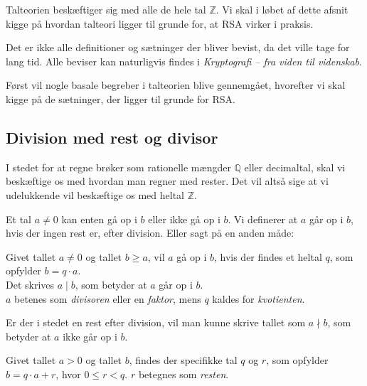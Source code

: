 

Talteorien beskæftiger sig med alle de hele tal \(\mathbb{Z}\).
Vi skal i løbet af dette afsnit kigge på hvordan talteori ligger til grunde for, at RSA virker i praksis.

Det er ikke alle definitioner og sætninger der bliver bevist, da det ville tage for lang tid.
Alle beviser kan naturligvis findes i \textit{Kryptografi -- fra viden til videnskab}. \cite{krypto}
\par
Først vil nogle basale begreber i talteorien blive gennemgået, hvorefter vi skal kigge på de sætninger, der ligger til grunde for RSA.

\subsection{Division med rest og divisor}
I stedet for at regne brøker som rationelle mængder \(\mathbb{Q}\) eller decimaltal, skal vi beskæftige os med hvordan man regner med rester.
Det vil altså sige at vi udelukkende vil beskæftige os med heltal \(\mathbb{Z}\).

Et tal \(a \neq 0\) kan enten gå op i \(b\) eller ikke gå op i \(b\).
Vi definerer at \(a\) går op i \(b\), hvis der ingen rest er, efter division. Eller sagt på en anden måde:


\begin{definition}
    \label{heldiv}
    Givet tallet \(a \neq 0\) og tallet \(b \geq a\), vil \(a\) gå op i \(b\),
    hvis der findes et heltal \(q\), som opfylder \(b = q \cdot a\).\\
    Det skrives \(a \mid b\), som betyder at \(a\) går op i \(b\).\\
    \(a\) betenes som \textit{divisoren} eller en \textit{faktor},
    mens \(q\) kaldes for \textit{kvotienten}.\cite[70]{krypto}
\end{definition}

Er der i stedet en rest efter division, vil man kunne skrive tallet som \(a \nmid b\), som betyder at \(a\) ikke går op i \(b\).

\begin{sent}
    \label{rest}
    Givet tallet \(a > 0\) og tallet \(b\), findes der specifikke tal \(q\) og \(r\), som opfylder \(b = q \cdot a + r\), hvor \(0 \leq r < q\). \(r\) betegnes som \textit{resten}.
\end{sent}



